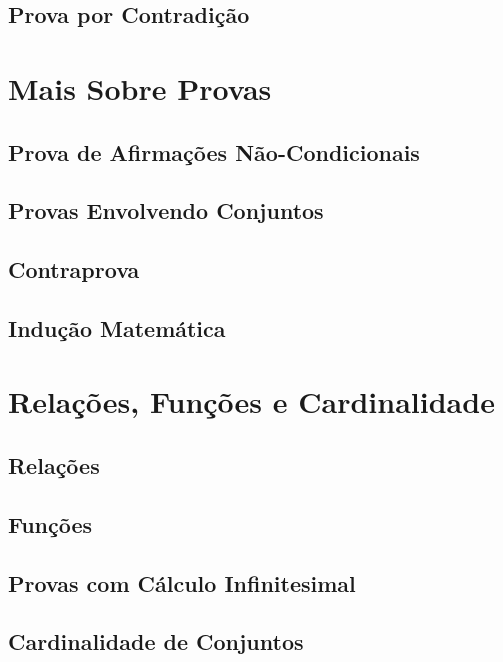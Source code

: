 \documentclass[a4paper,11pt,oneside]{book}
\theoremstyle{definition}
\theoremstyle{break}
\begin{document}
\chapter{Prova por Contradição}


\part{Mais Sobre Provas}

\chapter{Prova de Afirmações Não-Condicionais}

\chapter{Provas Envolvendo Conjuntos}

\chapter{Contraprova}

\chapter{Indução Matemática}


\part{Relações, Funções e Cardinalidade}

\chapter{Relações}

\chapter{Funções}

\chapter{Provas com Cálculo Infinitesimal}

\chapter{Cardinalidade de Conjuntos}
\end{document}
